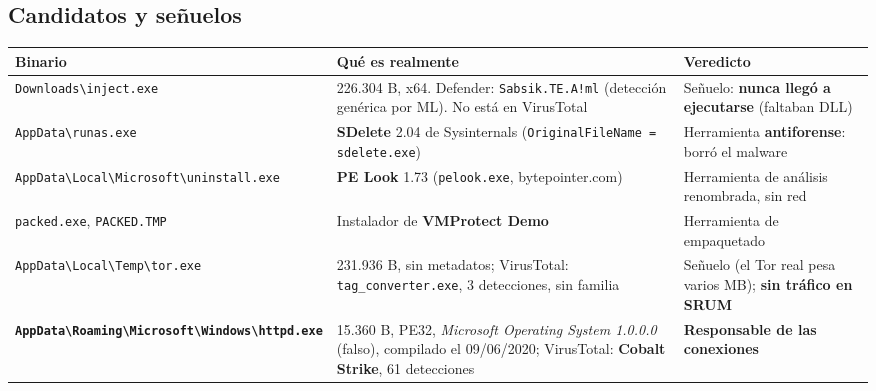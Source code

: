 \documentclass[11pt,a4paper]{article}
\newcommand{\bs}{\textbackslash\allowbreak{}}
\begin{document}
\subsection{Candidatos y señuelos}
\begin{longtable}{@{}L{3.6cm}L{6.2cm}L{5.3cm}@{}}
\toprule
\textbf{Binario} & \textbf{Qué es realmente} & \textbf{Veredicto} \\ \midrule \endhead
\texttt{Downloads\bs inject.exe} & 226.304 B, x64. Defender: \texttt{Sabsik.TE.A!ml} (detección genérica por ML). No está en VirusTotal & Señuelo: \textbf{nunca llegó a ejecutarse} (faltaban DLL) \\
\texttt{AppData\bs runas.exe} & \textbf{SDelete} 2.04 de Sysinternals (\texttt{OriginalFileName = sdelete.exe}) & Herramienta \textbf{antiforense}: borró el malware \\
\texttt{AppData\bs Local\bs Microsoft\bs uninstall.exe} & \textbf{PE Look} 1.73 (\texttt{pelook.exe}, bytepointer.com) & Herramienta de análisis renombrada, sin red \\
\texttt{packed.exe}, \texttt{PACKED.TMP} & Instalador de \textbf{VMProtect Demo} & Herramienta de empaquetado \\
\texttt{AppData\bs Local\bs Temp\bs tor.exe} & 231.936 B, sin metadatos; VirusTotal: \texttt{tag\_converter.exe}, 3 detecciones, sin familia & Señuelo (el Tor real pesa varios MB); \textbf{sin tráfico en SRUM} \\
\textbf{\texttt{AppData\bs Roaming\bs Microsoft\bs Windows\bs httpd.exe}} & 15.360 B, PE32, \emph{Microsoft Operating System 1.0.0.0} (falso), compilado el 09/06/2020; VirusTotal: \textbf{Cobalt Strike}, 61 detecciones & \textbf{Responsable de las conexiones} \\
\bottomrule
\end{longtable}
\end{document}
